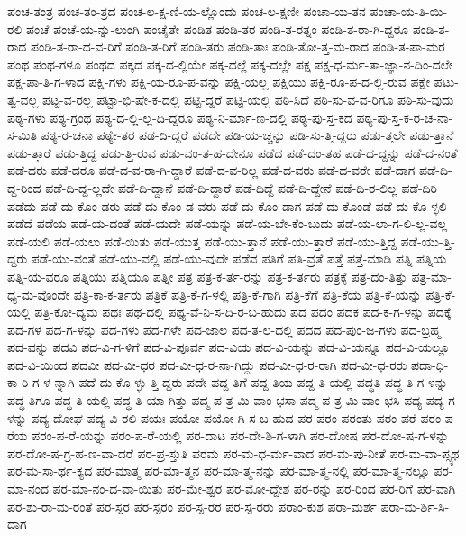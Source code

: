 {ಪಂಚ-ತಂತ್ರ
ಪಂಚ-ತಂ-ತ್ರದ
ಪಂಚ-ಲ-ಕ್ಷ-ಣಿ-ಯ-ಲ್ಲೊಂದು
ಪಂಚ-ಲ-ಕ್ಷಣೀ
ಪಂಚಾ-ಯ-ತನ
ಪಂಚಾ-ಯ-ತಿ-ಯಿ-ರಲಿ
ಪಂಚೆ
ಪಂಚೆ-ಯ-ನ್ನು-ಲುಂಗಿ
ಪಂಚೈತೇ
ಪಂಡಿತ
ಪಂಡಿ-ತರ
ಪಂಡಿ-ತ-ರತ್ನಂ
ಪಂಡಿ-ತ-ರಾ-ಗಿ-ದ್ದರೂ
ಪಂಡಿ-ತ-ರಾದ
ಪಂಡಿ-ತ-ರಾ-ದ-ವ-ರಿಗೆ
ಪಂಡಿ-ತ-ರಿಗೆ
ಪಂಡಿ-ತರು
ಪಂಡಿ-ತಾಃ
ಪಂಡಿ-ತೋ-ತ್ತ-ಮ-ರಾದ
ಪಂಡಿ-ತ-ಪಾ-ಮರ
ಪಂಥ
ಪಂಥ-ಗಳೂ
ಪಂಥದ
ಪಕ್ಕದ
ಪಕ್ಕ-ದ-ಲ್ಲಿಯೇ
ಪಕ್ಕ-ದಲ್ಲೆ
ಪಕ್ಕ-ದಲ್ಲೇ
ಪಕ್ಷ
ಪಕ್ಷ-ಧ-ರ್ಮ-ತಾ-ಜ್ಞಾ-ನ-ದಿಂ-ದಲೇ
ಪಕ್ಷ-ಪಾ-ತಿ-ಗ-ಳಾದ
ಪಕ್ಷಿ-ಗಳು
ಪಕ್ಷಿ-ಯ-ರೂ-ಪ-ವನ್ನು
ಪಕ್ಷಿ-ಯಲ್ಲ
ಪಕ್ಷಿಯು
ಪಕ್ಷಿ-ರೂ-ಪ-ದ-ಲ್ಲಿ-ರುವ
ಪಕ್ಷೇ
ಪಟು-ತ್ವ-ವಲ್ಲ
ಪಟ್ಟ-ವ-ರಲ್ಲ
ಪಟ್ಟಾ-ಭಿ-ಷೇ-ಕ-ದಲ್ಲಿ
ಪಟ್ಟಿ-ದ್ದರೆ
ಪಟ್ಟಿ-ಯಲ್ಲಿ
ಪಠಿ-ಸಿದೆ
ಪಠಿ-ಸು-ವ-ವ-ರಿಗೂ
ಪಠಿ-ಸು-ವುದು
ಪಠ್ಯ-ಗಳು
ಪಠ್ಯ-ಗ್ರಂಥ
ಪಠ್ಯ-ದ-ಲ್ಲಿ-ಲ್ಲ-ದಿ-ದ್ದರೂ
ಪಠ್ಯ-ನಿ-ರ್ಮಾ-ಣ-ದಲ್ಲಿ
ಪಠ್ಯ-ಪು-ಸ್ತ-ಕದ
ಪಠ್ಯ-ಪು-ಸ್ತ-ಕ-ರ-ಚ-ನಾ-ಸ-ಮಿತಿ
ಪಠ್ಯ-ರ-ಚನಾ
ಪಠ್ಯೇ-ತರ
ಪಡ-ದಿ-ದ್ದರೆ
ಪಡದೇ
ಪಡಿ-ಯ-ಚ್ಚನ್ನು
ಪಡಿ-ಸು-ತ್ತಿ-ದ್ದರು
ಪಡು-ತ್ತಲೇ
ಪಡು-ತ್ತಾನೆ
ಪಡು-ತ್ತಾರೆ
ಪಡು-ತ್ತಿದ್ದ
ಪಡು-ತ್ತಿ-ರುವ
ಪಡು-ವಂ-ತ-ಹ-ದೇನೂ
ಪಡೆದ
ಪಡೆ-ದಂ-ತಹ
ಪಡೆ-ದ-ದ್ದನ್ನು
ಪಡೆ-ದ-ನಂತೆ
ಪಡೆ-ದರು
ಪಡೆ-ದರೂ
ಪಡೆ-ದ-ವ-ರಾ-ಗಿ-ದ್ದಾರೆ
ಪಡೆ-ದ-ವ-ರಿಲ್ಲ
ಪಡೆ-ದ-ವರು
ಪಡೆ-ದ-ವರೇ
ಪಡೆ-ದಾಗ
ಪಡೆ-ದಿ-ದ್ದ-ರಿಂದ
ಪಡೆ-ದಿ-ದ್ದ-ಲ್ಲದೇ
ಪಡೆ-ದಿ-ದ್ದಾನೆ
ಪಡೆ-ದಿ-ದ್ದಾರೆ
ಪಡೆ-ದಿದ್ದೆ
ಪಡೆ-ದಿ-ದ್ದೇನೆ
ಪಡೆ-ದಿ-ರ-ಲಿಲ್ಲ
ಪಡೆ-ದಿರಿ
ಪಡೆದು
ಪಡೆ-ದು-ಕೊಂ-ಡರು
ಪಡೆ-ದು-ಕೊಂ-ಡ-ವರು
ಪಡೆ-ದು-ಕೊಂ-ಡಾಗ
ಪಡೆ-ದು-ಕೊಂಡೆ
ಪಡೆ-ದು-ಕೊ-ಳ್ಳಲಿ
ಪಡೆದೆ
ಪಡೆಯ
ಪಡೆ-ಯ-ದಂತೆ
ಪಡೆ-ಯದೇ
ಪಡೆ-ಯನ್ನು
ಪಡೆ-ಯ-ಬೇ-ಕೆಂ-ಬುದು
ಪಡೆ-ಯ-ಲಾ-ಗ-ಲಿ-ಲ್ಲ-ವಲ್ಲ
ಪಡೆ-ಯಲಿ
ಪಡೆ-ಯಲು
ಪಡೆ-ಯಿತು
ಪಡೆ-ಯುತ್ತ
ಪಡೆ-ಯು-ತ್ತಾನೆ
ಪಡೆ-ಯು-ತ್ತಾರೆ
ಪಡೆ-ಯು-ತ್ತಿದ್ದ
ಪಡೆ-ಯು-ತ್ತಿ-ದ್ದರು
ಪಡೆ-ಯು-ವಂತೆ
ಪಡೆ-ಯು-ವಲ್ಲಿ
ಪಡೆ-ಯು-ವುದೇ
ಪಡೆವ
ಪತಿಗೆ
ಪತಿ-ವ್ರತೆ
ಪತ್ತೆ
ಪತ್ತೆ-ಮಾಡಿ
ಪತ್ನಿ
ಪತ್ನಿಯ
ಪತ್ನಿ-ಯ-ವರೂ
ಪತ್ನಿಯು
ಪತ್ನಿಯೂ
ಪತ್ನೀ
ಪತ್ರ
ಪತ್ರ-ಕ-ರ್ತ-ರನ್ನು
ಪತ್ರ-ಕ-ರ್ತರು
ಪತ್ರಕ್ಕೆ
ಪತ್ರ-ದಂ-ತಿತ್ತು
ಪತ್ರ-ಮಾ-ಧ್ಯ-ಮ-ವೊಂದೇ
ಪತ್ರಿ-ಕಾ-ಕ-ರ್ತರು
ಪತ್ರಿಕೆ
ಪತ್ರಿ-ಕೆ-ಗ-ಳಲ್ಲಿ
ಪತ್ರಿ-ಕೆ-ಗಾಗಿ
ಪತ್ರಿ-ಕೆಗೆ
ಪತ್ರಿ-ಕೆಯ
ಪತ್ರಿ-ಕೆ-ಯನ್ನು
ಪತ್ರಿ-ಕೆ-ಯಲ್ಲಿ
ಪತ್ರಿ-ಕೋ-ದ್ಯಮ
ಪಥಃ
ಪಥ-ದಲ್ಲಿ
ಪಥ್ಯ-ವೆ-ನಿ-ಸ-ದಿ-ರ-ಬ-ಹುದು
ಪದ
ಪದಂ
ಪದಕ
ಪದ-ಕ-ಗ-ಳನ್ನು
ಪದಕ್ಕೆ
ಪದ-ಗಳ
ಪದ-ಗ-ಳನ್ನು
ಪದ-ಗಳು
ಪದ-ಗಳೇ
ಪದ-ಜಾಲ
ಪದ-ತ-ಲ-ದಲ್ಲಿ
ಪದದ
ಪದ-ಪುಂ-ಜ-ಗಳು
ಪದ-ಬ್ರಹ್ಮ
ಪದ-ವನ್ನು
ಪದವಿ
ಪದ-ವಿ-ಗ-ಳಿಗೆ
ಪದ-ವಿ-ಪೂರ್ವ
ಪದ-ವಿಯ
ಪದ-ವಿ-ಯನ್ನು
ಪದ-ವಿ-ಯನ್ನೂ
ಪದ-ವಿ-ಯಲ್ಲೂ
ಪದ-ವಿ-ಯಿಂದ
ಪದವೀ
ಪದ-ವೀ-ಧರ
ಪದ-ವೀ-ಧ-ರ-ನಾ-ಗಿದ್ದು
ಪದ-ವೀ-ಧ-ರ-ರಾಗಿ
ಪದ-ವೀ-ಧ-ರರು
ಪದಾ-ಧಿ-ಕಾ-ರಿ-ಗ-ಳ-ನ್ನಾಗಿ
ಪದೆ-ದು-ಕೊ-ಳ್ಳು-ತ್ತಿ-ದ್ದರು
ಪದೇ
ಪದ್ದ-ತಿಗೆ
ಪದ್ದ-ತಿಯ
ಪದ್ದ-ತಿ-ಯಲ್ಲಿ
ಪದ್ಧತಿ
ಪದ್ಧ-ತಿ-ಗ-ಳನ್ನು
ಪದ್ಧ-ತಿಗೂ
ಪದ್ಧ-ತಿ-ಯಲ್ಲಿ
ಪದ್ಧ-ತಿ-ಯಾ-ಗಿತ್ತು
ಪದ್ಮ-ಪ-ತ್ರ-ಮಿ-ವಾಂ-ಭಸಾ
ಪದ್ಮ-ಪ-ತ್ರ-ಮಿ-ವಾಂ-ಭಸಿ
ಪದ್ಯ
ಪದ್ಯ-ಗ-ಳನ್ನು
ಪದ್ಯ-ದೋಘ
ಪದ್ಯ-ವಿ-ರಲಿ
ಪಯಃ
ಪಯೋ
ಪಯೋ-ಗಿ-ಸ-ಬ-ಹುದ
ಪರ
ಪರಂ
ಪರಂತು
ಪರಂ-ಪರೆ
ಪರಂ-ಪ-ರೆಯ
ಪರಂ-ಪ-ರೆ-ಯನ್ನು
ಪರಂ-ಪ-ರೆ-ಯಲ್ಲಿ
ಪರ-ದಾಟ
ಪರ-ದೇ-ಶಿ-ಗ-ಳಾಗಿ
ಪರ-ದೋಷ
ಪರ-ದೋ-ಷ-ಗ-ಳನ್ನು
ಪರ-ದೋ-ಷ-ಗ್ರ-ಹ-ಣ-ವಾ-ದರೆ
ಪರ-ಪ್ರ-ಸ್ತುತಿ
ಪರಮ
ಪರ-ಮ-ಧ-ರ್ಮ-ವಾದ
ಪರ-ಮ-ಪು-ನೀತೆ
ಪರ-ಮ-ವಾ-ಪ್ಸ್ಯಥ
ಪರ-ಮ-ಸಾ-ರ್ಥ-ಕ್ಯದ
ಪರ-ಮಾತ್ಮ
ಪರ-ಮಾ-ತ್ಮನ
ಪರ-ಮಾ-ತ್ಮ-ನನ್ನು
ಪರ-ಮಾ-ತ್ಮ-ನಲ್ಲಿ
ಪರ-ಮಾ-ತ್ಮ-ನಲ್ಲೂ
ಪರ-ಮಾ-ನಂದ
ಪರ-ಮಾ-ನಂ-ದ-ವಾ-ಯಿತು
ಪರ-ಮೇ-ಶ್ವರ
ಪರ-ಮೋ-ದ್ದೇಶ
ಪರ-ರನ್ನು
ಪರ-ರಿಂದ
ಪರ-ರಿಗೆ
ಪರ-ವಾಗಿ
ಪರ-ಶು-ರಾ-ಮ-ರಂತೆ
ಪರ-ಸ್ಪರ
ಪರ-ಸ್ಪರಂ
ಪರ-ಸ್ಪ-ರರ
ಪರ-ಸ್ಪ-ರರು
ಪರಾಂ-ಕುಶ
ಪರಾ-ಮರ್ಶ
ಪರಾ-ಮ-ರ್ಶಿ-ಸಿ-ದಾಗ
}
